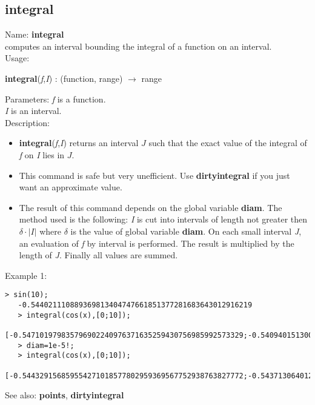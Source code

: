 \subsection{ integral }
\noindent Name: \textbf{integral}\\
computes an interval bounding the integral of a function on an interval.\\

\noindent Usage: 
\begin{center}
\textbf{integral}(\emph{f},\emph{I}) : (\textsf{function}, \textsf{range}) $\rightarrow$ \textsf{range}\\
\end{center}
Parameters: 
\emph{f} is a function.\\
\emph{I} is an interval.\\

\noindent Description: \begin{itemize}

\item \textbf{integral}(\emph{f},\emph{I}) returns an interval $J$ such that the exact value of 
   the integral of \emph{f} on \emph{I} lies in $J$.

\item This command is safe but very unefficient. Use \textbf{dirtyintegral} if you just want
   an approximate value.

\item The result of this command depends on the global variable \textbf{diam}.
   The method used is the following: \emph{I} is cut into intervals of length not 
   greater then $\delta \cdot |I|$ where $\delta$ is the value
   of global variable \textbf{diam}.
   On each small interval \emph{J}, an evaluation of \emph{f} by interval is
   performed. The result is multiplied by the length of \emph{J}. Finally all values 
   are summed.
\end{itemize}
\noindent Example 1: 
\begin{center}\begin{minipage}{14.8cm}\begin{Verbatim}[frame=single]
   > sin(10);
   -0.544021110889369813404747661851377281683643012916219
   > integral(cos(x),[0;10]);
   [-0.547101979835796902240976371635259430756985992573329;-0.540940151300131838481505408813733707440537411917285]
   > diam=1e-5!;
   > integral(cos(x),[0;10]);
   [-0.544329156859554271018577802959369567752938763827772;-0.543713064012499695080396442219274890104258031735553]
\end{Verbatim}
\end{minipage}\end{center}
See also: \textbf{points}, \textbf{dirtyintegral}
